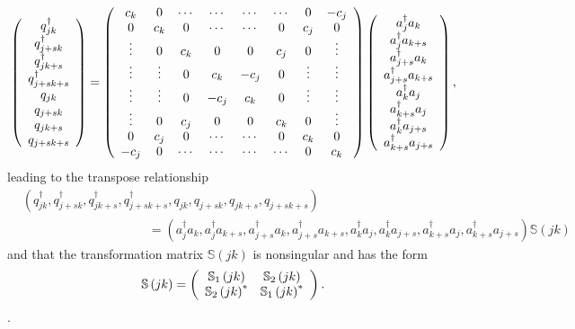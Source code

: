\documentclass[aps,preprint]{revtex4}%
\begin{document}
\begin{equation}
\left(
\begin{array}
[c]{c}%
q_{jk}^{\dagger}\\
q_{j+sk}^{\dagger}\\
q_{jk+s}^{\dagger}\\
q_{j+sk+s}^{\dagger}\\
q_{jk}\\
q_{j+sk}\\
q_{jk+s}\\
q_{j+sk+s}%
\end{array}
\right)  =\left(
\begin{array}
[c]{cccccccc}%
c_{k} & 0 & \cdots & \cdots & \cdots & \cdots & 0 & -c_{j}\\
0 & c_{k} & 0 & \cdots & \cdots & 0 & c_{j} & 0\\
\vdots & 0 & c_{k} & 0 & 0 & c_{j} & 0 & \vdots\\
\vdots & \vdots & 0 & c_{k} & -c_{j} & 0 & \vdots & \vdots\\
\vdots & \vdots & 0 & -c_{j} & c_{k} & 0 & \vdots & \vdots\\
\vdots & 0 & c_{j} & 0 & 0 & c_{k} & 0 & \vdots\\
0 & c_{j} & 0 & \cdots & \cdots & 0 & c_{k} & 0\\
-c_{j} & 0 & \cdots & \cdots & \cdots & \cdots & 0 & c_{k}%
\end{array}
\right)  \left(
\begin{array}
[c]{c}%
a_{j}^{\dagger}a_{k}\\
a_{j}^{\dagger}a_{k+s}\\
a_{j+s}^{\dagger}a_{k}\\
a_{j+s}^{\dagger}a_{k+s}\\
a_{k}^{\dagger}a_{j}\\
a_{k+s}^{\dagger}a_{j}\\
a_{k}^{\dagger}a_{j+s}\\
a_{k+s}^{\dagger}a_{j+s}%
\end{array}
\right)  ,
\end{equation}
leading to the transpose relationship
\begin{align}
&  \left(  q_{jk}^{\dagger},q_{j+sk}^{\dagger},q_{jk+s}^{\dagger}%
,q_{j+sk+s}^{\dagger},q_{jk},q_{j+sk},q_{jk+s},q_{j+sk+s}\right) \nonumber\\
&  \qquad\qquad\qquad\qquad\qquad\left.  =\right.  \left(  a_{j}^{\dagger
}a_{k},a_{j}^{\dagger}a_{k+s},a_{j+s}^{\dagger}a_{k},a_{j+s}^{\dagger}%
a_{k+s},a_{k}^{\dagger}a_{j},a_{k}^{\dagger}a_{j+s},a_{k+s}^{\dagger}%
a_{j},a_{k+s}^{\dagger}a_{j+s}\right)  \mathbb{S}\left(  jk\right)
\end{align}
and that the transformation matrix $\mathbb{S}\left(  jk\right)  $ is
nonsingular and has the form
\begin{equation}
\mathbb{S}\left(  jk\right)  =\left(
\begin{array}
[c]{cc}%
\mathbb{S}_{1}\left(  jk\right)  & \mathbb{S}_{2}\left(  jk\right) \\
\mathbb{S}_{2}\left(  jk\right)  ^{\ast} & \mathbb{S}_{1}\left(  jk\right)
^{\ast}%
\end{array}
\right)  .
\end{equation}
.
\end{document}
